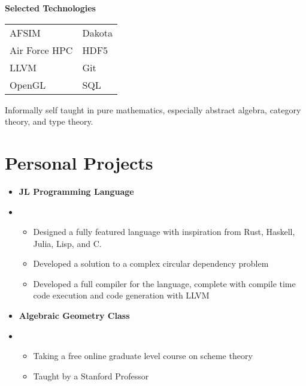 \documentclass[10pt]{article}
\begin{document}
\begin{paracol}{2}
{            \begin{center}
                \textbf{Selected Technologies}
            \end{center}
            \begin{tabularx}{\linewidth}{YY}
                AFSIM & Dakota \\
                Air Force HPC & HDF5 \\
                LLVM & Git \\
                OpenGL & SQL 
            \end{tabularx}
            
            \medskip
            
            Informally self taught in pure mathematics, especially abstract algebra,
            category theory, and type theory.
        }

        \section*{Personal Projects}
        \parbox[top][][c]{\linewidth}{
            \begin{itemize}
                \item[] \textbf{JL Programming Language}
                \item[] \begin{itemize}
                    \item Designed a fully featured language with inspiration from Rust, Haskell, Julia, Lisp, and C.
                    \item Developed a solution to a complex circular dependency problem
                    \item Developed a full compiler for the language, complete with compile time code execution and code generation with LLVM
                \end{itemize}
                \item[] \textbf{Algebraic Geometry Class}
                \item[] \begin{itemize}
                    \item Taking a free online graduate level course on scheme theory
                    \item Taught by a Stanford Professor
                \end{itemize}
            \end{itemize}
        }

        \switchcolumn


\end{paracol}
\end{document}
